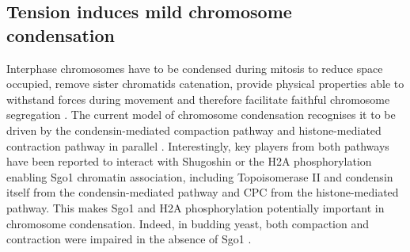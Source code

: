 \subsection{Tension induces mild chromosome condensation}

Interphase chromosomes have to be condensed during mitosis to reduce space occupied, remove sister chromatids catenation, provide physical properties able to withstand forces during movement and therefore facilitate faithful chromosome segregation \citep{Antonin2016ChromosomeMitosis, Piskadlo2016NovelCondensation, Beseda2020MitoticVariability, Takahashi2019FoldingChromosomes}. The current model of chromosome condensation recognises it to be driven by the condensin-mediated compaction pathway and histone-mediated contraction pathway in parallel \citep{Wilkins2014AMitosis, Kruitwagen2015a}. Interestingly, key players from both pathways have been reported to interact with Shugoshin or the H2A phosphorylation enabling Sgo1 chromatin association, including Topoisomerase II \citep{Zhang2020FunctioningMitosis} and condensin itself \citep{Verzijlbergen2014, Yahya2020} from the condensin-mediated pathway and CPC \citep{Abad2022MechanisticCPC} from the histone-mediated pathway. This makes Sgo1 and H2A phosphorylation potentially important in chromosome condensation. Indeed, in budding yeast, both compaction and contraction were impaired in the absence of Sgo1 \citep{Kruitwagen2018}. 

